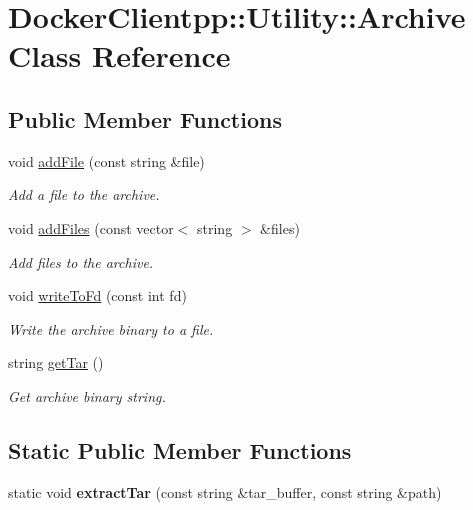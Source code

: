 \hypertarget{classDockerClientpp_1_1Utility_1_1Archive}{}\section{Docker\+Clientpp\+::Utility\+::Archive Class Reference}
\label{classDockerClientpp_1_1Utility_1_1Archive}
\subsection*{Public Member Functions}
\begin{DoxyCompactItemize}
\item 
void \mbox{\hyperlink{classDockerClientpp_1_1Utility_1_1Archive_a8da05be9d6c0e8c17c91e55ca2adf4aa}{add\+File}} (const string \&file)
\begin{DoxyCompactList}\small\item\em Add a file to the archive. \end{DoxyCompactList}\item 
void \mbox{\hyperlink{classDockerClientpp_1_1Utility_1_1Archive_aa0060b070ff34aeefcb3a9323a1b05d9}{add\+Files}} (const vector$<$ string $>$ \&files)
\begin{DoxyCompactList}\small\item\em Add files to the archive. \end{DoxyCompactList}\item 
void \mbox{\hyperlink{classDockerClientpp_1_1Utility_1_1Archive_abe92387b2d2c32c378d50e2cdb618fcc}{write\+To\+Fd}} (const int fd)
\begin{DoxyCompactList}\small\item\em Write the archive binary to a file. \end{DoxyCompactList}\item 
string \mbox{\hyperlink{classDockerClientpp_1_1Utility_1_1Archive_a807a2158377a51028c4abb1e70ef6f27}{get\+Tar}} ()
\begin{DoxyCompactList}\small\item\em Get archive binary string. \end{DoxyCompactList}\end{DoxyCompactItemize}
\subsection*{Static Public Member Functions}
\begin{DoxyCompactItemize}
\item 
\mbox{\label{classDockerClientpp_1_1Utility_1_1Archive_a497915f22a9c0a9038dd59ff4c233b51}} 
static void {\bfseries extract\+Tar} (const string \&tar\+\_\+buffer, const string \&path)
\end{DoxyCompactItemize}


